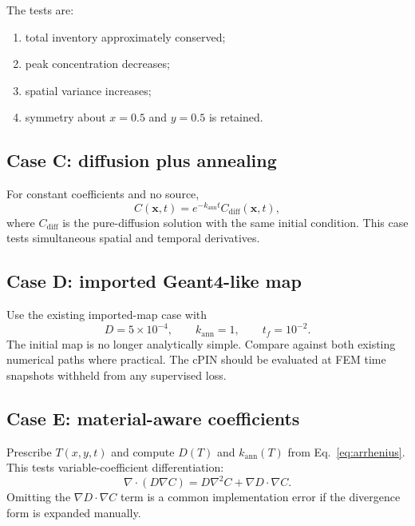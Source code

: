 \documentclass[11pt]{article}
\newcommand{\xv}{\bm{x}}
\begin{document}
The tests are:
\begin{enumerate}[label=\arabic*.]
    \item total inventory approximately conserved;
    \item peak concentration decreases;
    \item spatial variance increases;
    \item symmetry about $x=0.5$ and $y=0.5$ is retained.
\end{enumerate}

\subsection{Case C: diffusion plus annealing}

For constant coefficients and no source,
\begin{equation}
C(\xv,t)
=
e^{-k_{\mathrm{ann}}t}
C_{\mathrm{diff}}(\xv,t),
\label{eq:diffusion_annealing_product}
\end{equation}
where $C_{\mathrm{diff}}$ is the pure-diffusion solution with the same initial condition. This case tests simultaneous spatial and temporal derivatives.

\subsection{Case D: imported Geant4-like map}

Use the existing imported-map case with
\begin{equation}
D=5\times10^{-4},
\qquad
k_{\mathrm{ann}}=1,
\qquad
t_f=10^{-2}.
\end{equation}
The initial map is no longer analytically simple. Compare against both existing numerical paths where practical. The cPIN should be evaluated at FEM time snapshots withheld from any supervised loss.

\subsection{Case E: material-aware coefficients}

Prescribe $T(x,y,t)$ and compute $D(T)$ and $k_{\mathrm{ann}}(T)$ from Eq.~\eqref{eq:arrhenius}. This tests variable-coefficient differentiation:
\begin{equation}
\nabla\cdot(D\nabla C)
=
D\nabla^2C+\nabla D\cdot\nabla C.
\label{eq:variable_diffusivity_expansion}
\end{equation}
Omitting the $\nabla D\cdot\nabla C$ term is a common implementation error if the divergence form is expanded manually.
\end{document}
